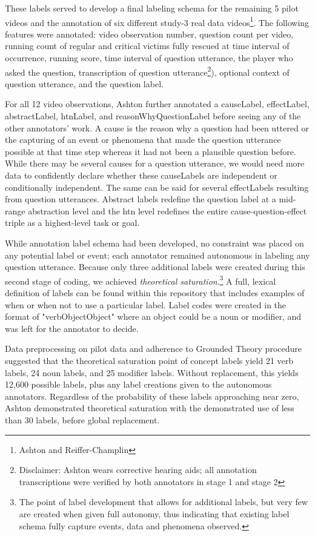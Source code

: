 \documentclass[10pt]{article}
\begin{document}
These labels served to develop a final labeling schema for the remaining 5 pilot videos and the annotation of six different study-3 real data videos\footnote{Ashton and Reiffer-Champlin}. The following features were annotated: video observation number, question count per video, running count of regular and critical victims fully rescued at time interval of occurrence, running score, time interval of question utterance, the player who asked the question, transcription of question utterance\footnote{Disclaimer: Ashton wears corrective hearing aids; all annotation transcriptions were verified by both annotators in stage 1 and stage 2}), optional context of question utterance, and the question label. 

For all 12 video observations, Ashton further annotated a causeLabel, effectLabel, abstractLabel, htnLabel, and reasonWhyQuestionLabel before seeing any of the other annotators' work. A cause is the reason why a question had been uttered or the capturing of an event or phenomena that made the question utterance possible at that time step whereas it had not been a plausible question before. While there may be several causes for a question utterance, we would need more data to confidently declare whether these causeLabels are independent or conditionally independent. The same can be said for several effectLabels resulting from question utterances. Abstract labels redefine the question label at a mid-range abstraction level and the htn level redefines the entire cause-question-effect triple as a highest-level task or goal. 

While annotation label schema had been developed, no constraint was placed on any potential label or event; each annotator remained autonomous in labeling any question utterance. Because only three additional labels were created during this second stage of coding, we achieved \emph{theoretical saturation}.\footnote{The point of label development that allows for additional labels, but very few are created when given full autonomy, thus indicating that existing label schema fully capture events, data and phenomena observed.} A full, lexical definition of labels can be found within this repository that includes examples of when or when not to use a particular label. Label codes were created in the format of "verbObjectObject" where an object could be a noun or modifier, and was left for the annotator to decide.  


Data preprocessing on pilot data and adherence to Grounded Theory procedure suggested that the theoretical saturation point of concept labels  yield 21 verb labels, 24 noun labels, and 25 modifier labels. Without replacement, this yields 12,600 possible labels, plus any label creations given to the autonomous annotators. Regardless of the probability of these labels approaching near zero, Ashton demonstrated theoretical saturation with the demonstrated use of less than 30 labels, before global replacement.
\end{document}
